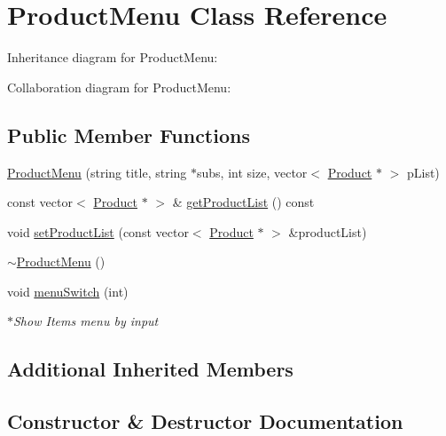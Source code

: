 \hypertarget{classProductMenu}{}\section{Product\+Menu Class Reference}
\label{classProductMenu}


Inheritance diagram for Product\+Menu\+:


Collaboration diagram for Product\+Menu\+:
\subsection*{Public Member Functions}
\begin{DoxyCompactItemize}
\item 
\hyperlink{classProductMenu_a3983fa9a21b0fdee2165ecee63c65789}{Product\+Menu} (string title, string $\ast$subs, int size, vector$<$ \hyperlink{classProduct}{Product} $\ast$ $>$ p\+List)
\item 
const vector$<$ \hyperlink{classProduct}{Product} $\ast$ $>$ \& \hyperlink{classProductMenu_a4f0609d8e1adaf479e339b11ff81becd}{get\+Product\+List} () const 
\item 
void \hyperlink{classProductMenu_a2c7a0b496eba98d6aa26fcc0772a1fff}{set\+Product\+List} (const vector$<$ \hyperlink{classProduct}{Product} $\ast$ $>$ \&product\+List)
\item 
\hyperlink{classProductMenu_aaf9c9ffabcacddc2d76319845077186d}{$\sim$\+Product\+Menu} ()
\item 
void \hyperlink{classProductMenu_a24a18c11760a828b7b7de4acc22bcce5}{menu\+Switch} (int)
\begin{DoxyCompactList}\small\item\em $\ast$\+Show Items menu by input \end{DoxyCompactList}\end{DoxyCompactItemize}
\subsection*{Additional Inherited Members}


\subsection{Constructor \& Destructor Documentation}
